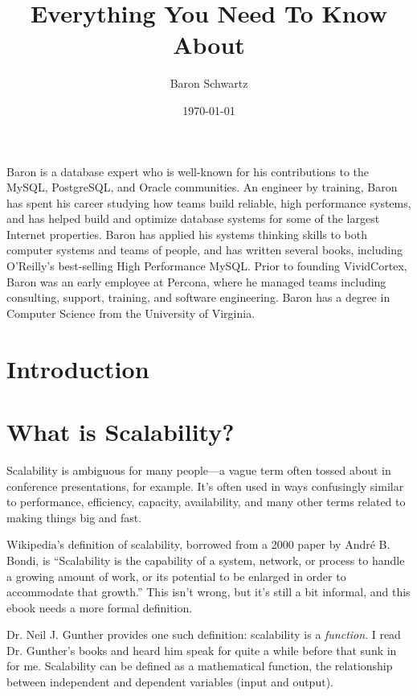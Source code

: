 \documentclass{vivid_layout}
\title{Everything You Need To Know About}{Scalability}
\date{\today}
\author{Baron Schwartz}{img/baron}
\begin{document}
\maketitle		%
\begin{bio}		%
Baron is a database expert who is well-known for his contributions to the MySQL, PostgreSQL, and Oracle communities. An engineer by training, Baron has spent his career studying how teams build reliable, high performance systems, and has helped build and optimize database systems for some of the largest Internet properties. Baron has applied his systems thinking skills to both computer systems and teams of people, and has written several books, including O'Reilly's best-selling High Performance MySQL. Prior to founding VividCortex, Baron was an early employee at Percona, where he managed teams including consulting, support, training, and software engineering. Baron has a degree in Computer Science from the University of Virginia.
\end{bio}
\tableofcontents	%

\section{Introduction}

\section{What is Scalability?}

Scalability is ambiguous for many people---a vague term often tossed about in
conference presentations, for example. It's often used in ways confusingly
similar to performance, efficiency, capacity, availability, and many other terms
related to making things big and fast.

Wikipedia's definition of scalability, borrowed from a 2000 paper by Andr\'e B.
Bondi, is ``Scalability is the capability of a system, network, or process to
handle a growing amount of work, or its potential to be enlarged in order to
accommodate that growth.'' This isn't wrong, but it's still a bit informal, and
this ebook needs a more formal definition.

Dr. Neil J. Gunther provides one such definition: scalability is a {\itshape
function}. I read Dr. Gunther's books and heard him speak for quite a while
before that sunk in for me. Scalability can be defined as a mathematical
function, the relationship between independent and dependent variables (input
and output).
\end{document}
